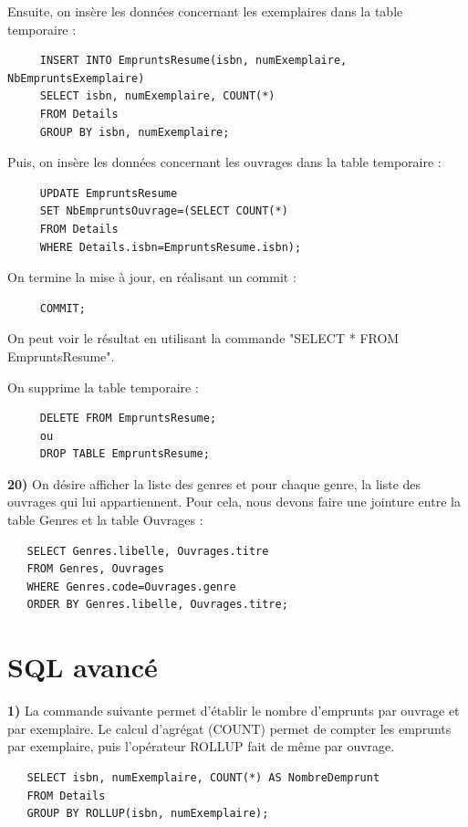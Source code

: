 \documentclass[a4paper,12pt]{article}
\begin{document}
 Ensuite, on insère les données concernant les exemplaires dans la table temporaire :      
        \begin{lstlisting}
     INSERT INTO EmpruntsResume(isbn, numExemplaire, NbEmpruntsExemplaire)
     SELECT isbn, numExemplaire, COUNT(*)
     FROM Details
     GROUP BY isbn, numExemplaire;
          \end{lstlisting}

Puis, on insère les données concernant les ouvrages dans la table temporaire : 
    \begin{lstlisting}
     UPDATE EmpruntsResume
     SET NbEmpruntsOuvrage=(SELECT COUNT(*)
     FROM Details
     WHERE Details.isbn=EmpruntsResume.isbn);
     \end{lstlisting}   
     
On termine la mise à jour, en réalisant un commit : 
     \begin{lstlisting}
     COMMIT;
      \end{lstlisting} 

On peut voir le résultat en utilisant la commande "SELECT * FROM EmpruntsResume". 

On supprime la table temporaire : 
    \begin{lstlisting}
     DELETE FROM EmpruntsResume;
     ou 
     DROP TABLE EmpruntsResume;
     \end{lstlisting}
     
  \textbf {20)}   On désire afficher la liste  des  genres  et  pour  chaque  genre,  la  liste  des  ouvrages  qui  lui  appartiennent. Pour cela, nous devons faire une jointure entre la table Genres et la table Ouvrages : 
  
   \begin{lstlisting}
   SELECT Genres.libelle, Ouvrages.titre
   FROM Genres, Ouvrages
   WHERE Genres.code=Ouvrages.genre
   ORDER BY Genres.libelle, Ouvrages.titre;
   \end{lstlisting}
   
   \section{SQL avancé}
   
   \textbf {1)}  La commande suivante permet d'établir le nombre d'emprunts par ouvrage et par exemplaire. Le calcul d'agrégat (COUNT) permet de compter les emprunts par exemplaire, puis l'opérateur ROLLUP fait de même par ouvrage.
   
   \begin{lstlisting}
   SELECT isbn, numExemplaire, COUNT(*) AS NombreDemprunt 
   FROM Details 
   GROUP BY ROLLUP(isbn, numExemplaire);
   \end{lstlisting}
	
\end{document}
